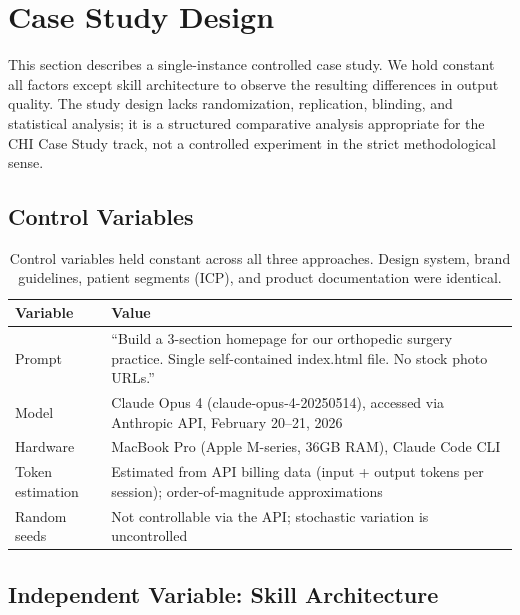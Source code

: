 \documentclass[conference]{IEEEtran}
\begin{document}
\section{Case Study Design}\label{case-study-design}

This section describes a single-instance controlled case study. We hold constant all factors except skill architecture to observe the resulting differences in output quality. The study design lacks randomization, replication, blinding, and statistical analysis; it is a structured comparative analysis appropriate for the CHI Case Study track, not a controlled experiment in the strict methodological sense.

\subsection{Control Variables}\label{control-variables}

\begin{table}[htbp]
\caption{Control variables held constant across all three approaches. Design
system, brand guidelines, patient segments (ICP), and product
documentation were identical.}
\centering
\footnotesize
\begin{tabular}{>{\raggedright\arraybackslash}p{}>{\raggedright\arraybackslash}p{}}
\toprule
Variable & Value \\
\midrule
Prompt & ``Build a 3-section homepage for our orthopedic surgery practice. Single
self-contained index.html file. No stock photo URLs.'' \\
Model & Claude Opus 4 (claude-opus-4-20250514), accessed via Anthropic API,
February 20--21, 2026 \\
Hardware & MacBook Pro (Apple M-series, 36GB RAM), Claude Code CLI \\
Token estimation & Estimated from API billing data (input + output tokens per session);
order-of-magnitude approximations \\
Random seeds & Not controllable via the API; stochastic variation is uncontrolled \\
\bottomrule
\end{tabular}
\end{table}

\subsection{Independent Variable: Skill Architecture}\label{independent-variable-skill-architecture}
\end{document}
